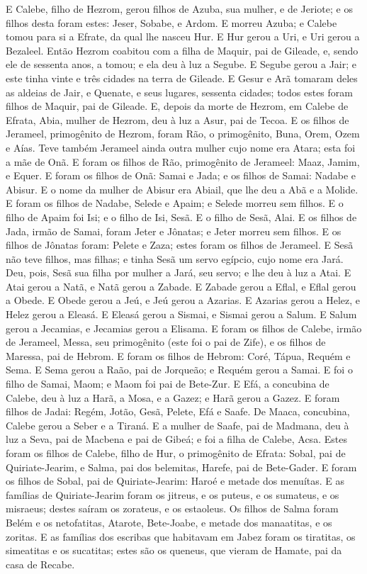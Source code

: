 E Calebe, filho de Hezrom, gerou filhos de Azuba, sua mulher, e
de Jeriote; e os filhos desta foram estes: Jeser, Sobabe, e Ardom.
E morreu Azuba; e Calebe tomou para si a Efrate, da qual lhe
nasceu Hur. E Hur gerou a Uri, e Uri gerou a Bezaleel.
Então Hezrom coabitou com a filha de Maquir, pai de Gileade,
e, sendo ele de sessenta anos, a tomou; e ela deu à luz a Segube.
E Segube gerou a Jair; e este tinha vinte e três cidades na
terra de Gileade. E Gesur e Arã tomaram deles as aldeias de
Jair, e Quenate, e seus lugares, sessenta cidades; todos estes foram
filhos de Maquir, pai de Gileade. E, depois da morte de
Hezrom, em Calebe de Efrata, Abia, mulher de Hezrom, deu à luz a
Asur, pai de Tecoa. E os filhos de Jerameel, primogênito de
Hezrom, foram Rão, o primogênito, Buna, Orem, Ozem e Aías.
Teve também Jerameel ainda outra mulher cujo nome era Atara;
esta foi a mãe de Onã. E foram os filhos de Rão, primogênito
de Jerameel: Maaz, Jamim, e Equer. E foram os filhos de Onã:
Samai e Jada; e os filhos de Samai: Nadabe e Abisur. E o nome
da mulher de Abisur era Abiail, que lhe deu a Abã e a Molide.
E foram os filhos de Nadabe, Selede e Apaim; e Selede morreu
sem filhos. E o filho de Apaim foi Isi; e o filho de Isi,
Sesã. E o filho de Sesã, Alai. E os filhos de Jada, irmão de
Samai, foram Jeter e Jônatas; e Jeter morreu sem filhos. E os
filhos de Jônatas foram: Pelete e Zaza; estes foram os filhos de
Jerameel. E Sesã não teve filhos, mas filhas; e tinha Sesã um
servo egípcio, cujo nome era Jará. Deu, pois, Sesã sua filha
por mulher a Jará, seu servo; e lhe deu à luz a Atai. E Atai
gerou a Natã, e Natã gerou a Zabade. E Zabade gerou a Eflal,
e Eflal gerou a Obede. E Obede gerou a Jeú, e Jeú gerou a
Azarias. E Azarias gerou a Helez, e Helez gerou a Eleasá.
E Eleasá gerou a Sismai, e Sismai gerou a Salum. E
Salum gerou a Jecamias, e Jecamias gerou a Elisama. E foram
os filhos de Calebe, irmão de Jerameel, Messa, seu primogênito (este
foi o pai de Zife), e os filhos de Maressa, pai de Hebrom. E
foram os filhos de Hebrom: Coré, Tápua, Requém e Sema. E Sema
gerou a Raão, pai de Jorqueão; e Requém gerou a Samai. E foi
o filho de Samai, Maom; e Maom foi pai de Bete-Zur. E Efá, a
concubina de Calebe, deu à luz a Harã, a Mosa, e a Gazez; e Harã
gerou a Gazez. E foram filhos de Jadai: Regém, Jotão, Gesã,
Pelete, Efá e Saafe. De Maaca, concubina, Calebe gerou a
Seber e a Tiraná. E a mulher de Saafe, pai de Madmana, deu à
luz a Seva, pai de Macbena e pai de Gibeá; e foi a filha de Calebe,
Acsa. Estes foram os filhos de Calebe, filho de Hur, o
primogênito de Efrata: Sobal, pai de Quiriate-Jearim, e
Salma, pai dos belemitas, Harefe, pai de Bete-Gader. E foram
os filhos de Sobal, pai de Quiriate-Jearim: Haroé e metade dos
menuítas. E as famílias de Quiriate-Jearim foram os jitreus,
e os puteus, e os sumateus, e os misraeus; destes saíram os
zorateus, e os estaoleus. Os filhos de Salma foram Belém e os
netofatitas, Atarote, Bete-Joabe, e metade dos manaatitas, e os
zoritas. E as famílias dos escribas que habitavam em Jabez
foram os tiratitas, os simeatitas e os sucatitas; estes são os
queneus, que vieram de Hamate, pai da casa de Recabe.


